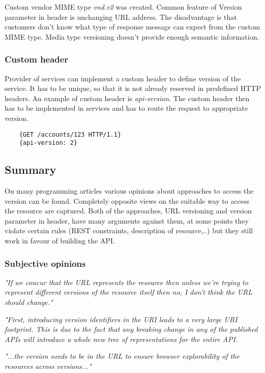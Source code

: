 Custom vendor MIME type \emph{vnd.v2} was created. Common feature of Version parameter in header is unchanging URL address. The disadvantage is that customers don't know what type of response message can expect from the custom MIME type. Media type versioning doesn't provide enough semantic information.


\subsubsection{Custom header}
Provider of services can implement a custom header to define version of the service. It has to be unique, so that it is not already reserved in predefined HTTP headers. An example of custom header is \emph{api-version}. The custom header then has to be implemented in services and has to route the request to appropriate version.

\begin{lstlisting}
    {GET /accounts/123 HTTP/1.1}
    {api-version: 2}
\end{lstlisting}


\subsection{Summary}
On many programming articles various opinions about approaches to access the version can be found. Completely opposite views on the suitable way to access the resource are captured. Both of the approaches, URL versioning and version parameter in header, have many arguments against them, at some points they violate certain rules (REST constraints, description of resource,..) but they still work in favour of building the API.

\subsubsection{Subjective opinions}
\emph{"If we concur that the URL represents the resource then unless we’re trying to represent different versions of the resource itself then no, I don’t think the URL should change."\cite{website:wrong-ways}}
\bigskip

\emph{"First, introducing version identifiers in the URI leads to a very large URI footprint. This is due to the fact that any breaking change in any of the published APIs will introduce a whole new tree of representations for the entire API.\cite{website:versioning-rest-api}}
\bigskip

\emph{"...the version needs to be in the URL to ensure browser explorability of the resources across versions..."\cite{website:best-practices-rest}}
\bigskip


